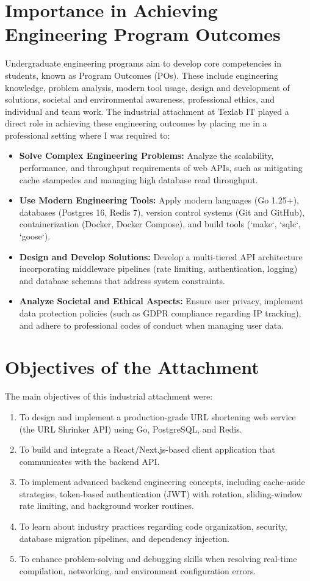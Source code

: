 \section{Importance in Achieving Engineering Program Outcomes}
Undergraduate engineering programs aim to develop core competencies in students, known as Program Outcomes (POs). These include engineering knowledge, problem analysis, modern tool usage, design and development of solutions, societal and environmental awareness, professional ethics, and individual and team work. The industrial attachment at Texlab IT played a direct role in achieving these engineering outcomes by placing me in a professional setting where I was required to:
\begin{itemize}
    \item \textbf{Solve Complex Engineering Problems:} Analyze the scalability, performance, and throughput requirements of web APIs, such as mitigating cache stampedes and managing high database read throughput.
    \item \textbf{Use Modern Engineering Tools:} Apply modern languages (Go 1.25+), databases (Postgres 16, Redis 7), version control systems (Git and GitHub), containerization (Docker, Docker Compose), and build tools (`make`, `sqlc`, `goose`).
    \item \textbf{Design and Develop Solutions:} Develop a multi-tiered API architecture incorporating middleware pipelines (rate limiting, authentication, logging) and database schemas that address system constraints.
    \item \textbf{Analyze Societal and Ethical Aspects:} Ensure user privacy, implement data protection policies (such as GDPR compliance regarding IP tracking), and adhere to professional codes of conduct when managing user data.
\end{itemize}

\section{Objectives of the Attachment}
The main objectives of this industrial attachment were:
\begin{enumerate}
    \item To design and implement a production-grade URL shortening web service (the URL Shrinker API) using Go, PostgreSQL, and Redis.
    \item To build and integrate a React/Next.js-based client application that communicates with the backend API.
    \item To implement advanced backend engineering concepts, including cache-aside strategies, token-based authentication (JWT) with rotation, sliding-window rate limiting, and background worker routines.
    \item To learn about industry practices regarding code organization, security, database migration pipelines, and dependency injection.
    \item To enhance problem-solving and debugging skills when resolving real-time compilation, networking, and environment configuration errors.
\end{enumerate}

